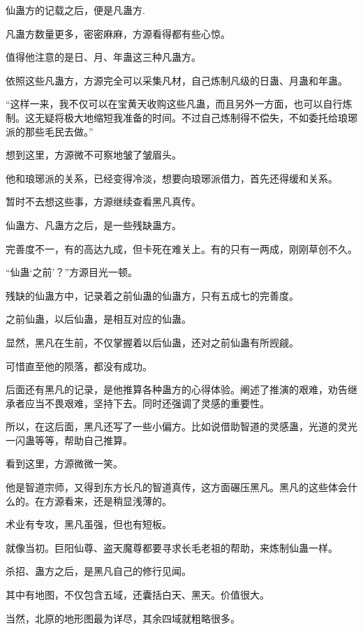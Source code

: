 
\begin{this_body}

仙蛊方的记载之后，便是凡蛊方.

凡蛊方数量更多，密密麻麻，方源看得都有些心惊。

值得他注意的是日、月、年蛊这三种凡蛊方。

依照这些凡蛊方，方源完全可以采集凡材，自己炼制凡级的日蛊、月蛊和年蛊。

“这样一来，我不仅可以在宝黄天收购这些凡蛊，而且另外一方面，也可以自行炼制。这无疑将极大地缩短我准备的时间。不过自己炼制得不偿失，不如委托给琅琊派的那些毛民去做。”

想到这里，方源微不可察地皱了皱眉头。

他和琅琊派的关系，已经变得冷淡，想要向琅琊派借力，首先还得缓和关系。

暂时不去想这些事，方源继续查看黑凡真传。

仙蛊方、凡蛊方之后，是一些残缺蛊方。

完善度不一，有的高达九成，但卡死在难关上。有的只有一两成，刚刚草创不久。

“仙蛊‘之前’？”方源目光一顿。

残缺的仙蛊方中，记录着之前仙蛊的仙蛊方，只有五成七的完善度。

之前仙蛊，以后仙蛊，是相互对应的仙蛊。

显然，黑凡在生前，不仅掌握着以后仙蛊，还对之前仙蛊有所觊觎。

可惜直至他的陨落，都没有成功。

后面还有黑凡的记录，是他推算各种蛊方的心得体验。阐述了推演的艰难，劝告继承者应当不畏艰难，坚持下去。同时还强调了灵感的重要性。

所以，在这后面，黑凡还写了一些小偏方。比如说借助智道的灵感蛊，光道的灵光一闪蛊等等，帮助自己推算。

看到这里，方源微微一笑。

他是智道宗师，又得到东方长凡的智道真传，这方面碾压黑凡。黑凡的这些体会什么的。在方源看来，还是稍显浅薄的。

术业有专攻，黑凡虽强，但也有短板。

就像当初。巨阳仙尊、盗天魔尊都要寻求长毛老祖的帮助，来炼制仙蛊一样。

杀招、蛊方之后，是黑凡自己的修行见闻。

其中有地图，不仅包含五域，还囊括白天、黑天。价值很大。

当然，北原的地形图最为详尽，其余四域就粗略很多。


\end{this_body}
